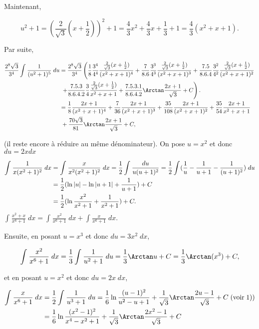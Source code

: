 {{Maintenant,

$$u^2+1=(\frac{2}{\sqrt{3}}(x+\frac{1}{2}))^2+1=\frac{4}{3}x^2+\frac{4}{3}x+\frac{1}{3}+1=\frac{4}{3}(x^2+x+1).$$

Par suite,

\begin{align*}\ensuremath
\frac{2^8\sqrt{3}}{3^4}\int_{}^{}\frac{1}{(u^2+1)^5}\;du&=\frac{2^8\sqrt{3}}{3^4}
\left(
\frac{1}{8}\frac{3^4}{4^4}\frac{\frac{2}{\sqrt{3}}(x+\frac{1}{2})}{(x^2+x+1)^4}
+\frac{7}{8.6}\frac{3^3}{4^3}\frac{\frac{2}{\sqrt{3}}(x+\frac{1}{2})}{(x^2+x+1)^3}
+\frac{7.5}{8.6.4}\frac{3^2}{4^2}\frac{\frac{2}{\sqrt{3}}(x+\frac{1}{2})}{(x^2+x+1)^2}
\right.
\\
 &\;\left.+\frac{7.5.3}{8.6.4.2}\frac{3}{4}\frac{\frac{2}{\sqrt{3}}(x+\frac{1}{2})}{x^2+x+1}
 +\frac{7.5.3.1}{8.6.4.2}\Arctan\frac{2x+1}{\sqrt{3}}+C
 \right).\\
 &=\frac{1}{8}\frac{2x+1}{(x^2+x+1)^4}+\frac{7}{36}\frac{2x+1}{(x^2+x+1)^3}+\frac{35}{108}\frac{2x+1}{(x^2+x+1)^2}+\frac{35}{54}\frac{2x+1}{x^2+x+1}\\
 &\;+\frac{70\sqrt{3}}{81}\Arctan\frac{2x+1}{\sqrt{3}}+C,
\end{align*}

(il reste encore à réduire au même dénominateur).
On pose $u=x^2$ et donc $du=2xdx$

\begin{align*}\ensuremath
\int_{}^{}\frac{1}{x(x^2+1)^2}\;dx&=\int_{}^{}\frac{x}{x^2(x^2+1)^2}\;dx=\frac{1}{2}\int_{}^{}\frac{du}{u(u+1)^2}
=\frac{1}{2}\int_{}^{}(\frac{1}{u}-\frac{1}{u+1}-\frac{1}{(u+1)^2})\;du\\
 &=\frac{1}{2}(\ln|u|-\ln|u+1|+\frac{1}{u+1})+C\\
 &=\frac{1}{2}(\ln\frac{x^2}{x^2+1}+\frac{1}{x^2+1})+C.
\end{align*}
$\int_{}^{}\frac{x^2+x}{x^6+1}\;dx=\int_{}^{}\frac{x^2}{x^6+1}\;dx+\int_{}^{}\frac{x}{x^6+1}\;dx$.

Ensuite, en posant $u=x^3$ et donc $du=3x^2\;dx$,

$$\int_{}^{}\frac{x^2}{x^6+1}\;dx=\frac{1}{3}\int_{}^{}\frac{1}{u^2+1}\;du=\frac{1}{3}\Arctan u+C=\frac{1}{3}\Arctan(x^3)+C,$$

et en posant $u=x^2$ et donc $du=2x\;dx$,

\begin{align*}\ensuremath
\int_{}^{}\frac{x}{x^6+1}\;dx&=\frac{1}{2}\int_{}^{}\frac{1}{u^3+1}\;du
=\frac{1}{6}\ln\frac{(u-1)^2}{u^2-u+1}+\frac{1}{\sqrt{3}}\Arctan\frac{2u-1}{\sqrt{3}}+C\;(\mbox{voir}\;1))\\
 &=\frac{1}{6}\ln\frac{(x^2-1)^2}{x^4-x^2+1}+\frac{1}{\sqrt{3}}\Arctan\frac{2x^2-1}{\sqrt{3}}+C
\end{align*}

}}
